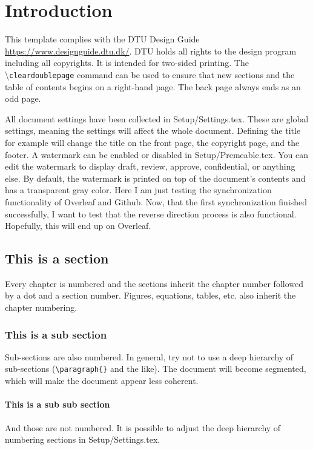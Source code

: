 \chapter{Introduction}
This template complies with the DTU Design Guide \url{https://www.designguide.dtu.dk/}. DTU holds all rights to the design program including all copyrights. It is intended for two-sided printing. The \textbackslash \texttt{cleardoublepage} command can be used to ensure that new sections and the table of contents begins on a right-hand page. The back page always ends as an odd page. 

All document settings have been collected in Setup/Settings.tex. These are global settings, meaning the settings will affect the whole document. Defining the title for example will change the title on the front page, the copyright page, and the footer. A watermark can be enabled or disabled in Setup/Premeable.tex. You can edit the watermark to display draft, review, approve, confidential, or anything else. By default, the watermark is printed on top of the document's contents and has a transparent gray color. Here I am just testing the synchronization functionality of Overleaf and Github. Now, that the first synchronization finished successfully, I want to test that the reverse direction process is also functional. Hopefully, this will end up on Overleaf.

\section{This is a section}
Every chapter is numbered and the sections inherit the chapter number followed by a dot and a section number. Figures, equations, tables, etc. also inherit the chapter numbering. 

\subsection{This is a sub section}
Sub-sections are also numbered. In general, try not to use a deep hierarchy of sub-sections (\texttt{\textbackslash paragraph\{\}} and the like). The document will become segmented, which will make the document appear less coherent. 

\subsubsection{This is a sub sub section}
And those are not numbered. It is possible to adjust the deep hierarchy of numbering sections in Setup/Settings.tex. 

